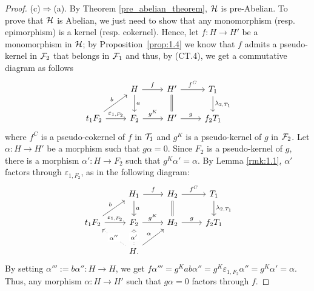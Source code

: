 \begin{proof}
\smallskip\noindent
(c)$\Rightarrow$(a). By Theorem \ref{pre_abelian_theorem}, $\mathcal{H}$ is pre-Abelian. To prove that $\mathcal{H}$ is Abelian, we just need to show that any monomorphism (resp. epimorphism) is a kernel (resp. cokernel).
Hence, let $f\colon H\to H'$ be a monomorphism in $\mathcal{H}$; by Proposition~\ref{prop:1.4}
we know that $f$ admits a pseudo-kernel in $\mathcal{F}_2$ that belongs in $\mathcal{F}_1$ and thus, by (CT.4), we get a commutative diagram as follows
\begin{equation*}
\begin{tikzcd}
 & H\arrow{r}{f}\arrow{d}{a} & H'\arrow{r}{f^C}\arrow[equal]{d} & T_1\arrow{d}{\lambda_{2,T_1}}\\
t_1F_2\arrow{ur}{b}\arrow{r}{\varepsilon_{1,F_2}} & F_2\arrow{r}{g^K} & H'\arrow{r}{g} & f_2T_1
\end{tikzcd}
\end{equation*}
where $f^C$  is a pseudo-cokernel of $f$ in $\mathcal{T}_1$ and $g^K$ is a pseudo-kernel of $g$ in $\mathcal{F}_2$. Let $\alpha\colon H\to H'$ be a morphism such that $g\alpha =0$. Since $F_2$ is a pseudo-kernel of $g$, there is a morphism $\alpha'\colon H\to F_2$ such that $g^K\alpha'=\alpha$. By Lemma \ref{rmk:1.1}, $\alpha'$ factors through  $\varepsilon_{1,F_2}$, as in the following diagram:
\begin{equation*}
\begin{tikzcd}
& H_1\arrow{r}{f}\arrow{d}{a} & H_2\arrow{r}{f^C}\arrow[equal]{d}& T_1\arrow{d}{\lambda_{2,T_1}}\\
t_1F_2\arrow{ur}{b}\arrow{r}{\varepsilon_{1,F_2}} & F_2\arrow{r}{g^K} & H_2\arrow{r}{g} & f_2T_1\\
& H.\arrow{ur}{\alpha}\arrow[dotted]{u}[description]{\alpha'}\arrow[dotted]{ul}[description]{\alpha''} & &
\end{tikzcd}
\end{equation*}
By setting $\alpha''' := b\alpha''\colon H\to H$, we get $f\alpha''' = g^K ab\alpha'' = g^K\varepsilon_{1,F_2}\alpha''=g^K\alpha' = \alpha$. Thus, any morphism $\alpha\colon H \to H'$ such that $g\alpha =0$ factors through $f$.
\end{proof}







